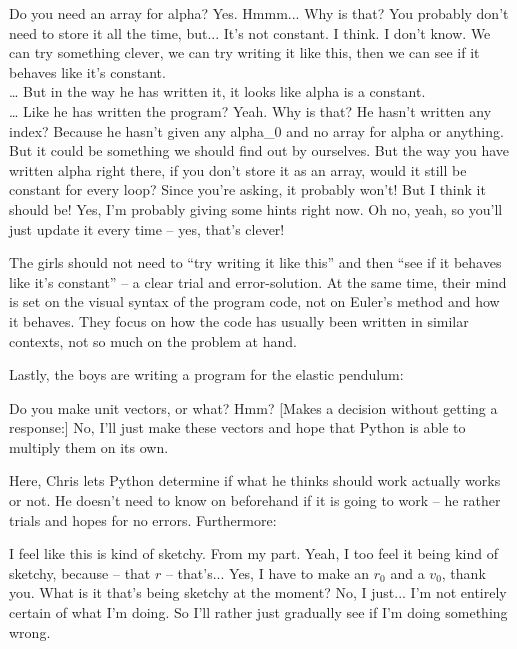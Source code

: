 \documentclass[aps,prb,floatfix,twocolumn,twoside,english]{revtex4-1}
\begin{document}
\begin{dialogue}
\small
{} Do you need an array for alpha?
 Yes.
 Hmmm...
 Why is that?
 You probably don't need to store it all the time, but... It's not constant. I think. I don't know. We can try something clever, we can try writing it like this, then we can see if it behaves like it's constant.
\\ \dots
{} But in the way he has written it, it looks like alpha is a constant.
\\ \dots
{} Like he has written the program? Yeah.
 Why is that? 
 He hasn't written any index?
 Because he hasn't given any alpha\_0 and no array for alpha or anything. But it could be something we should find out by ourselves.
 But the way you have written alpha right there, if you don't store it as an array, would it still be constant for every loop?
 Since you're asking, it probably won't! But I think it should be!
 Yes, I'm probably giving some hints right now.
 Oh no, yeah, so you'll just update it every time -- yes, that's clever!
\end{dialogue}


The girls should not need to ``try writing it like this'' and then ``see if it behaves like it's constant'' -- a clear trial and error-solution. At the same time, their mind is set on the visual syntax of the program code, not on Euler's method and how it behaves. They focus on how the code has usually been written in similar contexts, not so much on the problem at hand.

Lastly, the boys are writing a program for the elastic pendulum:

\begin{dialogue}
\small
{} Do you make unit vectors, or what?
 Hmm? 
 [Makes a decision without getting a response:] No, I'll just make these vectors and hope that Python is able to multiply them on its own.
\end{dialogue}

Here, Chris lets Python determine if what he thinks should work actually works or not. He doesn't need to know on beforehand if it is going to work -- he rather trials and hopes for no errors. Furthermore:

\begin{dialogue}
\small
{} I feel like this is kind of sketchy. From my part.
 Yeah, I too feel it being kind of sketchy, because -- that $r$ -- that's... 
 Yes, I have to make an $r_0$ and a $v_0$, thank you. 
 What is it that's being sketchy at the moment?
 No, I just... I'm not entirely certain of what I'm doing. So I'll rather just gradually see if I'm doing something wrong.
\end{dialogue}
\end{document}
